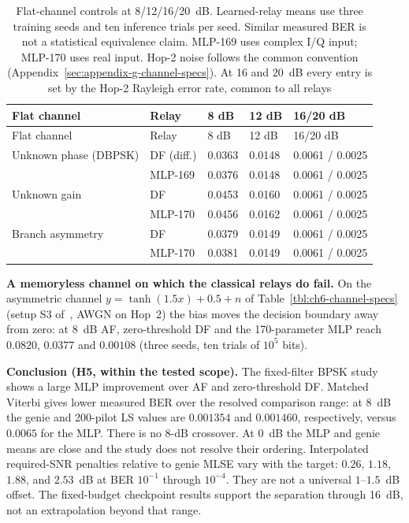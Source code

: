 \begin{longtable}[]{@{}lllll@{}}
\caption[Flat unknown channels]{Flat-channel controls at 8/12/16/20~dB. Learned-relay means use three training seeds and ten inference trials per seed. Similar measured BER is not a statistical equivalence claim. MLP-169 uses complex I/Q input; MLP-170 uses real input. Hop-2 noise follows the common convention (Appendix~\ref{sec:appendix-g-channel-specs}). At 16 and 20~dB every entry is set by the Hop-2 Rayleigh error rate, common to all relays}\label{tbl:tableE6flat}\tabularnewline
\toprule\noalign{}
Flat channel & Relay & 8 dB & 12 dB & 16/20 dB \\
\midrule\noalign{}
\endfirsthead
\toprule\noalign{}
Flat channel & Relay & 8 dB & 12 dB & 16/20 dB \\
\midrule\noalign{}
\endhead
\bottomrule\noalign{}
\endlastfoot
Unknown phase (DBPSK) & DF (diff.) & 0.0363 & 0.0148 & 0.0061 / 0.0025 \\
 & MLP-169 & 0.0376 & 0.0148 & 0.0061 / 0.0025 \\
Unknown gain & DF & 0.0453 & 0.0160 & 0.0061 / 0.0025 \\
 & MLP-170 & 0.0456 & 0.0162 & 0.0061 / 0.0025 \\
Branch asymmetry & DF & 0.0379 & 0.0149 & 0.0061 / 0.0025 \\
 & MLP-170 & 0.0381 & 0.0149 & 0.0061 / 0.0025 \\
\end{longtable}

\textbf{A memoryless channel on which the classical relays do fail.} On the asymmetric channel $y=\tanh(1.5x)+0.5+n$ of Table~\ref{tbl:ch6-channel-specs} (setup S3 of~, AWGN on Hop~2) the bias moves the decision boundary away from zero: at 8~dB AF, zero-threshold DF and the 170-parameter MLP reach $0.0820$, $0.0377$ and $0.00108$ (three seeds, ten trials of $10^{5}$ bits).

\textbf{Conclusion (H5, within the tested scope).} The fixed-filter BPSK study shows a large MLP improvement over AF and zero-threshold DF. Matched Viterbi gives lower measured BER over the resolved comparison range: at 8~dB the genie and 200-pilot LS values are $0.001354$ and $0.001460$, respectively, versus $0.0065$ for the MLP. There is no 8-dB crossover. At 0~dB the MLP and genie means are close and the study does not resolve their ordering. Interpolated required-SNR penalties relative to genie MLSE vary with the target: $0.26$, $1.18$, $1.88$, and $2.53$~dB at BER $10^{-1}$ through $10^{-4}$. They are not a universal $1$--$1.5$~dB offset. The fixed-budget checkpoint results support the separation through 16~dB, not an extrapolation beyond that range.


